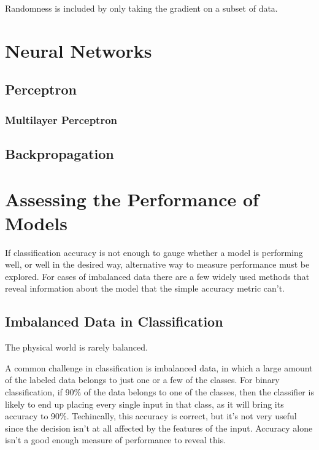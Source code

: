 Randomness is included by only taking the gradient on a subset of data.

\section{Neural Networks}
\subsection{Perceptron}

\subsubsection{Multilayer Perceptron}

\subsection{Backpropagation}

\section{Assessing the Performance of Models}
If classification accuracy is not enough to gauge whether a model is
performing well, or well in the desired way, alternative way to measure
performance must be explored. For cases of imbalanced data there are a few
widely used methods that reveal information about the model that the simple
accuracy metric can't.

\subsection{Imbalanced Data in Classification}
The physical world is rarely balanced.

A common challenge in classification is imbalanced data, in which a large
amount of the labeled data belongs to just one or a few of the classes.
For binary classification, if 90\% of the data belongs to one of the classes,
then the classifier is likely to end up placing every single
input in that class, as it will bring its accuracy to 90\%. Techincally, this
accuracy is correct, but it's not very useful since the decision isn't at all
affected by the features of the input. Accuracy alone isn't a good enough
measure of performance to reveal this.

